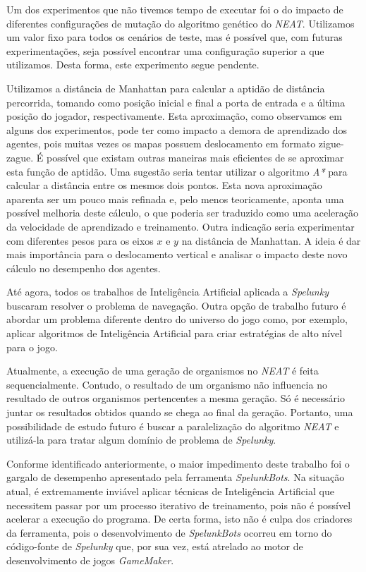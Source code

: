 Um dos experimentos que não tivemos tempo de executar foi o do impacto de
diferentes configurações de mutação do algoritmo genético do \textit{NEAT}.
Utilizamos um valor fixo para todos os cenários de teste, mas é possível que,
com futuras experimentações, seja possível encontrar uma configuração superior a
que utilizamos. Desta forma, este experimento segue pendente.

Utilizamos a distância de Manhattan para calcular a aptidão de distância
percorrida, tomando como posição inicial e final a porta de entrada e a última
posição do jogador, respectivamente. Esta aproximação, como observamos em alguns
dos experimentos, pode ter como impacto a demora de aprendizado dos agentes,
pois muitas vezes os mapas possuem deslocamento em formato zigue-zague. É
possível que existam outras maneiras mais eficientes de se aproximar esta função
de aptidão. Uma sugestão seria tentar utilizar o algoritmo \textit{A*} para
calcular a distância entre os mesmos dois pontos. Esta nova aproximação aparenta
ser um pouco mais refinada e, pelo menos teoricamente, aponta uma possível
melhoria deste cálculo, o que poderia ser traduzido como uma aceleração da
velocidade de aprendizado e treinamento. Outra indicação seria experimentar com
diferentes pesos para os eixos $x$ e $y$ na distância de Manhattan.  A ideia é
dar mais importância para o deslocamento vertical e analisar o impacto deste
novo cálculo no desempenho dos agentes.

Até agora, todos os trabalhos de Inteligência Artificial aplicada a
\textit{Spelunky} buscaram resolver o problema de navegação. Outra opção de
trabalho futuro é abordar um problema diferente dentro do universo do jogo como,
por exemplo, aplicar algoritmos de Inteligência Artificial para criar
estratégias de alto nível para o jogo.

Atualmente, a execução de uma geração de organismos no \textit{NEAT} é feita
sequencialmente.  Contudo, o resultado de um organismo não influencia no
resultado de outros organismos pertencentes a mesma geração. Só é necessário
juntar os resultados obtidos quando se chega ao final da geração. Portanto, uma
possibilidade de estudo futuro é buscar a paralelização do algoritmo
\textit{NEAT} e utilizá-la para tratar algum domínio de problema de
\textit{Spelunky}.

Conforme identificado anteriormente, o maior impedimento deste trabalho foi o
gargalo de desempenho apresentado pela ferramenta \textit{SpelunkBots}. Na
situação atual, é extremamente inviável aplicar técnicas de Inteligência
Artificial que necessitem passar por um processo iterativo de treinamento, pois
não é possível acelerar a execução do programa. De certa forma, isto não é culpa
dos criadores da ferramenta, pois o desenvolvimento de \textit{SpelunkBots}
ocorreu em torno do código-fonte de \textit{Spelunky} que, por sua vez, está
atrelado ao motor de desenvolvimento de jogos \textit{GameMaker}. 

